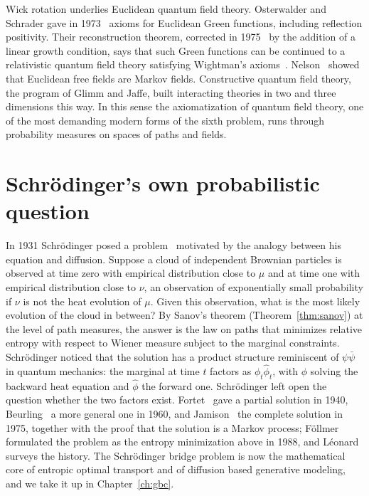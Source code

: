 Wick rotation underlies Euclidean quantum field theory. Osterwalder and Schrader gave in 1973~\cite{osterwalder1973} axioms for Euclidean Green functions, including reflection positivity. Their reconstruction theorem, corrected in 1975~\cite{osterwalder1975} by the addition of a linear growth condition, says that such Green functions can be continued to a relativistic quantum field theory satisfying Wightman's axioms~\cite{streater1964}. Nelson~\cite{nelson1973} showed that Euclidean free fields are Markov fields. Constructive quantum field theory, the program of Glimm and Jaffe, built interacting theories in two and three dimensions this way. In this sense the axiomatization of quantum field theory, one of the most demanding modern forms of the sixth problem, runs through probability measures on spaces of paths and fields.

\section{Schr\"odinger's own probabilistic question}

In 1931 Schr\"odinger posed a problem~\cite{schrodinger1931} motivated by the analogy between his equation and diffusion. Suppose a cloud of independent Brownian particles is observed at time zero with empirical distribution close to $\mu$ and at time one with empirical distribution close to $\nu$, an observation of exponentially small probability if $\nu$ is not the heat evolution of $\mu$. Given this observation, what is the most likely evolution of the cloud in between? By Sanov's theorem (Theorem~\ref{thm:sanov}) at the level of path measures, the answer is the law on paths that minimizes relative entropy with respect to Wiener measure subject to the marginal constraints. Schr\"odinger noticed that the solution has a product structure reminiscent of $\psi\bar\psi$ in quantum mechanics: the marginal at time $t$ factors as $\phi_t\hat\phi_t$, with $\phi$ solving the backward heat equation and $\hat\phi$ the forward one. Schr\"odinger left open the question whether the two factors exist. Fortet~\cite{fortet1940} gave a partial solution in 1940, Beurling~\cite{beurling1960} a more general one in 1960, and Jamison~\cite{jamison1975} the complete solution in 1975, together with the proof that the solution is a Markov process; F\"ollmer~\cite{follmer1988} formulated the problem as the entropy minimization above in 1988, and L\'eonard~\cite{leonard2014} surveys the history. The Schr\"odinger bridge problem is now the mathematical core of entropic optimal transport and of diffusion based generative modeling, and we take it up in Chapter~\ref{ch:gbc}.

